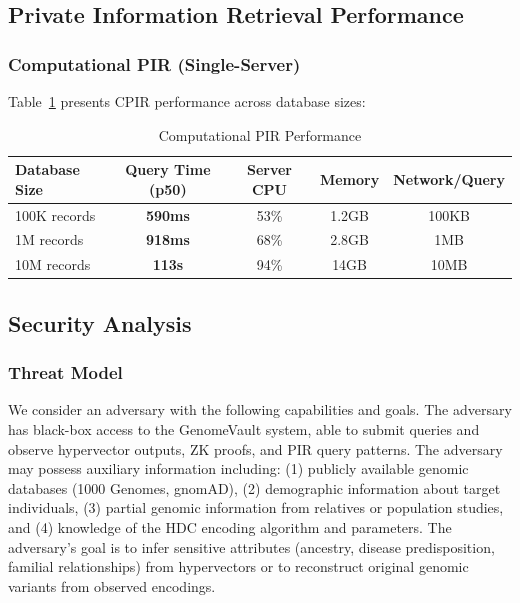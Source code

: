 \documentclass[11pt,letterpaper]{article}
\begin{document}
\subsection{Private Information Retrieval Performance}

\subsubsection{Computational PIR (Single-Server)}

Table~\ref{tab:cpir_performance} presents CPIR performance across database sizes:

\begin{table}[!ht]
\centering
\caption{Computational PIR Performance}
\label{tab:cpir_performance}
\begin{tabular}{lcccc}
\toprule
\textbf{Database Size} & \textbf{Query Time (p50)} & \textbf{Server CPU} & \textbf{Memory} & \textbf{Network/Query} \\
\midrule
100K records & \textbf{590ms} & 53\% & 1.2GB & 100KB \\
1M records & \textbf{918ms} & 68\% & 2.8GB & 1MB \\
10M records & \textbf{113s} & 94\% & 14GB & 10MB \\
\bottomrule
\end{tabular}
\end{table}

\subsection{Security Analysis}

\subsubsection{Threat Model}

We consider an adversary with the following capabilities and goals. The adversary has black-box access to the GenomeVault system, able to submit queries and observe hypervector outputs, ZK proofs, and PIR query patterns. The adversary may possess auxiliary information including: (1) publicly available genomic databases (1000 Genomes, gnomAD), (2) demographic information about target individuals, (3) partial genomic information from relatives or population studies, and (4) knowledge of the HDC encoding algorithm and parameters. The adversary's goal is to infer sensitive attributes (ancestry, disease predisposition, familial relationships) from hypervectors or to reconstruct original genomic variants from observed encodings.
\end{document}
